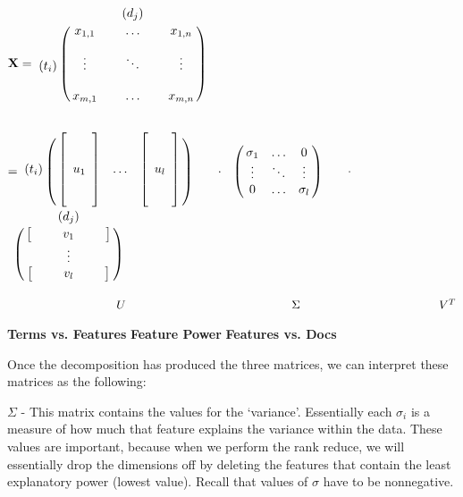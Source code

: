 \documentclass [12pt]{article}
\newcommand{\tab}{\hspace{10mm}}
\begin{document}
\begin{center}
$
    \textbf{X} = \bordermatrix{& & & (d_j) & & \cr
       & x_{1,1}  & &  \ldots & &  x_{1, n} \cr
       &  & &  & &  \cr
      (t_i)& \vdots &  & \ddots &  &    \vdots\cr
      &  & &  & &  \cr
      &  x_{m,1} & & \ldots &  & x_{m,n}}   \qquad$
\end{center}
      
      $= \bordermatrix{& & & \cr
    	 (t_i)& \left[ \begin{array}{c}
       		\\
		\\
		\textbf{$u_1$} \\
		\\
		\\ \end{array} \right] & \ldots &
		\left[ \begin{array}{c}
       		\\
		\\
		\textbf{$u_l$} \\
		\\
		\\ \end{array} \right] } \qquad \cdot$ 
       $\bordermatrix{& & & \cr
       &\sigma_1  &  \ldots & 0 \cr
      & \vdots  & \ddots &      \vdots\cr
      & 0 & \ldots &  \sigma_l}   \qquad \cdot$   
      $\bordermatrix{&  (d_j)  \cr
      &  \left[ \begin{array}{ccccc} 
      		& & \textbf{$v_1$} & &   \end{array}\right]   \cr
      &  \vdots   \cr
      &  \left[ \begin{array}{ccccc}
      		&&  \textbf{$v_l$} & & \end{array}\right] }   \qquad$ 
		
$\tab \tab \tab \hspace{2mm} U \tab \tab \tab \tab \hspace{9mm} \Sigma \tab \tab \tab \tab \hspace{1mm} V^T$	

\tab \hspace{6mm}  \textbf{Terms vs. Features} \tab \hspace{2mm} \textbf{Feature Power} \hspace{9mm} \textbf{Features vs. Docs}

Once the decomposition has produced the three matrices, we can interpret these matrices as the following: 

$\Sigma$ - This matrix contains the values for the `variance'. Essentially each $\sigma_i$ is a measure of how much that feature explains the variance within the data. These values are important, because when we perform the rank reduce, we will essentially drop the dimensions off by deleting the features that contain the least explanatory power (lowest value). Recall that values of $\sigma$ have to be nonnegative. 
\end{document}
